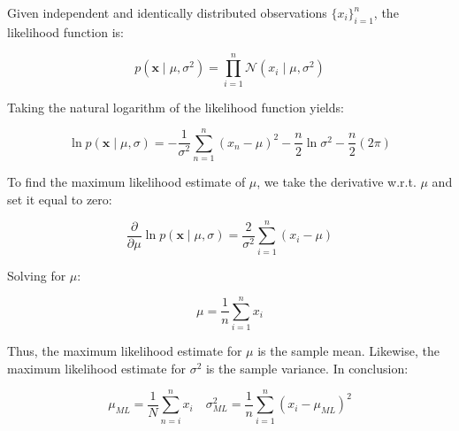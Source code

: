 Given independent and identically distributed observations $\{x_i\}_{i=1}^n$, the likelihood function is:

\[
    p(\mathbf{x} \mid \mu, \sigma^2) = \prod_{i = 1}^{n}\mathcal{N}(x_i \mid \mu, \sigma^2)
\]

Taking the natural logarithm of the likelihood function yields:

\[
    \ln{p(\mathbf{x} \mid \mu, \sigma)} = -\frac{1}{\sigma^2}\sum_{n=1}^{n}(x_n - \mu)^2 - \frac{n}{2}\ln \sigma^2 - \frac{n}{2}(2 \pi)
\]

To find the maximum likelihood estimate of $\mu$, we take the derivative w.r.t. $\mu$ and set it equal to zero:

\[
    \frac{\partial}{\partial \mu} \ln p(\mathbf{x} \mid \mu, \sigma)
    = \frac{2}{\sigma^2}\sum_{i=1}^{n}{(x_i - \mu)}
\]

Solving for $\mu$:

\[
    \mu = \frac{1}{n}\sum_{i=1}^{n}x_i
\]

Thus, the maximum likelihood estimate for $\mu$ is the sample mean.
Likewise, the maximum likelihood estimate for $\sigma^2$ is the sample variance.
In conclusion:

\[
    \mu_{ML} = \frac{1}{N}\sum_{n=i}^{n}{x_i}
    \quad
    \sigma^2_{ML} =  \frac{1}{n}\sum_{i = 1}^{n}{ (x_i - \mu_{ML})^2 }
\]